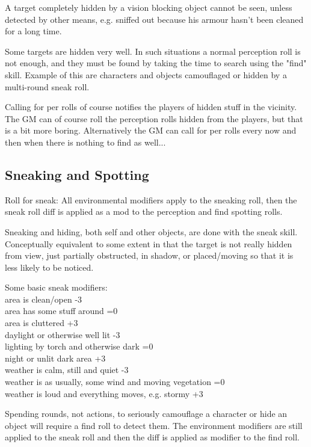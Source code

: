 A target completely hidden by a vision blocking object cannot be seen, unless detected by other means, e.g. sniffed out because his armour hasn't been cleaned for a long time.

Some targets are hidden very well. In such situations a normal perception roll is not enough, and they must be found by taking the time to search using the "find" skill. Example of this are characters and objects camouflaged or hidden by a multi-round sneak roll.

Calling for per rolls of course notifies the players of hidden stuff in the vicinity.
The GM can of course roll the perception rolls hidden from the players, but that is a bit more boring. Alternatively the GM can call for per rolls every now and then when there is nothing to find as well...


\subsection*{Sneaking and Spotting}
Roll for sneak: All environmental modifiers apply to the sneaking roll, then the sneak roll diff is applied as a mod to the perception and find spotting rolls.

Sneaking and hiding, both self and other objects, are done with the sneak skill. Conceptually equivalent to some extent in that the target is not really hidden from view, just partially obstructed, in shadow, or placed/moving so that it is less likely to be noticed.

Some basic sneak modifiers:\\
area is clean/open -3\\
area has some stuff around =0\\
area is cluttered +3\\
daylight or otherwise well lit -3\\
lighting by torch and otherwise dark =0\\
night or unlit dark area +3\\
weather is calm, still and quiet -3\\
weather is as usually, some wind and moving vegetation =0\\
weather is loud and everything moves, e.g. stormy  +3

Spending rounds, not actions, to seriously camouflage a character or hide an object will require a find roll to detect them. The environment modifiers are still applied to the sneak roll and then the diff is applied as modifier to the find roll.

